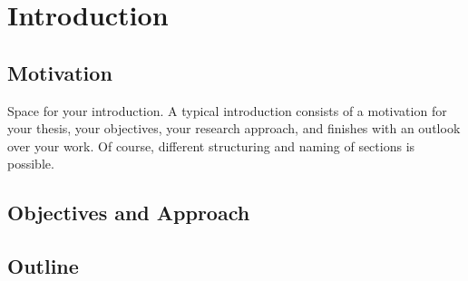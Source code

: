 \cleardoubleoddpage%
\chapter{Introduction}
\label{sec:introduction}


\section{Motivation}
\label{sec:introduction:motivation}

Space for your introduction.
A typical introduction consists of a motivation for your thesis, your objectives, your research approach, and finishes with an outlook over your work.
Of course, different structuring and naming of sections is possible.


\section{Objectives and Approach}
\label{sec:introduction:objectives}


\section{Outline}
\label{sec:introduction:outline}



